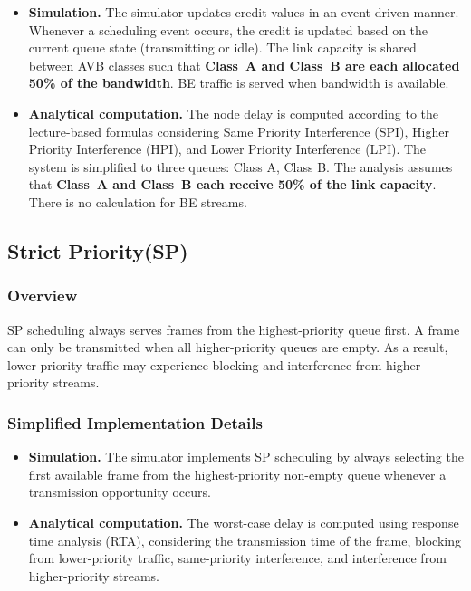 \begin{itemize}

\item \textbf{Simulation.}
The simulator updates credit values in an event-driven manner. 
Whenever a scheduling event occurs, the credit is updated based on the current queue state (transmitting or idle). 
The link capacity is shared between AVB classes such that \textbf{Class~A and Class~B are each allocated 50\% of the bandwidth}. 
BE traffic is served when bandwidth is available.

\item \textbf{Analytical computation.}
The node delay is computed according to the lecture-based formulas considering Same Priority Interference (SPI), Higher Priority Interference (HPI), and Lower Priority Interference (LPI). 
The system is simplified to three queues: Class A, Class B. The analysis assumes that \textbf{Class~A and Class~B each receive 50\% of the link capacity}.
There is no calculation for BE streams.

\end{itemize}

\subsection{Strict Priority(SP)}

\subsubsection{Overview}
SP scheduling always serves frames from the highest-priority queue first. 
A frame can only be transmitted when all higher-priority queues are empty. 
As a result, lower-priority traffic may experience blocking and interference from higher-priority streams.

\subsubsection{Simplified Implementation Details}

\begin{itemize}

\item \textbf{Simulation.}
The simulator implements SP scheduling by always selecting the first available frame from the highest-priority non-empty queue whenever a transmission opportunity occurs.

\item \textbf{Analytical computation.}
The worst-case delay is computed using response time analysis (RTA), considering the transmission time of the frame, blocking from lower-priority traffic, same-priority interference, and interference from higher-priority streams.

\end{itemize}